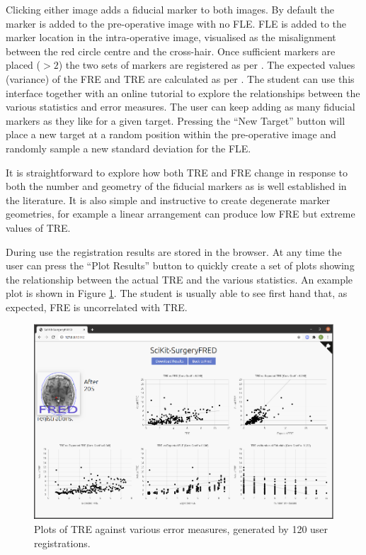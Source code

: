 Clicking either image adds a fiducial marker to both images. By default the marker is added to the pre-operative image 
with no \gls{FLE}. \gls{FLE} is added to the marker location in the intra-operative image, visualised as the misalignment
between the red circle centre and the cross-hair. Once sufficient markers are placed ($>2$) the two sets of markers are registered as per \cite{Arun1987}. The expected values (variance) of the \gls{FRE} and \gls{TRE} are calculated 
as per \cite{Fitzpatrick1998}. The student can use this interface together with an 
online tutorial 
to explore the relationships between the various statistics and error measures. The
user can keep adding as many fiducial markers as they like for a given target. 
Pressing the ``New Target'' button will place a new target at a random position 
within the pre-operative image and randomly sample a new standard deviation for the
\gls{FLE}.

It is straightforward to explore how both \gls{TRE} and \gls{FRE} change in response to 
both the number and geometry of the fiducial markers as is well established in the literature\cite{1295074, Fitzpatrick1998}. 
It is
also simple and instructive to create degenerate marker geometries, for example 
a linear arrangement can produce low \gls{FRE} but extreme values of \gls{TRE}.

During use the registration results are 
stored in the browser. At any time the user can press the ``Plot Results'' button to quickly create a set of 
plots showing the relationship between the actual \gls{TRE} and the various statistics. 
An example plot is shown in Figure \ref{fig:correlation}. 
The student is usually able to see first hand that, as expected, \gls{FRE} is uncorrelated with \gls{TRE}. 

\begin{figure}
	\begin{center}
	\includegraphics[width=0.9\linewidth]{images/default.eps}
		\caption{\label{fig:correlation}Plots of TRE against various error measures, generated by 
		120 user registrations.}
	\end{center}
\end{figure}

